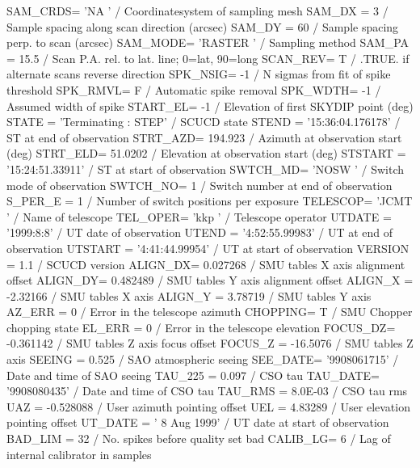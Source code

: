 \documentclass[twoside,11pt,nolof]{starlink}
\begin{document}
\begin{small}
\begin{terminalv}
SAM_CRDS= 'NA      '           / Coordinatesystem of sampling mesh
SAM_DX  =                    3 / Sample spacing along scan direction (arcsec)
SAM_DY  =                   60 / Sample spacing perp. to scan (arcsec)
SAM_MODE= 'RASTER  '           / Sampling method
SAM_PA  =                 15.5 / Scan P.A. rel. to lat. line; 0=lat, 90=long
SCAN_REV=                    T / .TRUE. if alternate scans reverse direction
SPK_NSIG=                   -1 / N sigmas from fit of spike threshold
SPK_RMVL=                    F / Automatic spike removal
SPK_WDTH=                   -1 / Assumed width of spike
START_EL=                   -1 / Elevation of first SKYDIP point (deg)
STATE   = 'Terminating         :   STEP' / SCUCD state
STEND   = '15:36:04.176178'    / ST at end of observation
STRT_AZD=              194.923 / Azimuth at observation start (deg)
STRT_ELD=              51.0202 / Elevation at observation start (deg)
STSTART = '15:24:51.33911'     / ST at start of observation
SWTCH_MD= 'NOSW    '           / Switch mode of observation
SWTCH_NO=                    1 / Switch number at end of observation
S_PER_E =                    1 / Number of switch positions per exposure
TELESCOP= 'JCMT    '           / Name of telescope
TEL_OPER= 'kkp     '           / Telescope operator
UTDATE  = '1999:8:8'           / UT date of observation
UTEND   = '4:52:55.99983'      / UT at end of observation
UTSTART = '4:41:44.99954'      / UT at start of observation
VERSION =                  1.1 / SCUCD version
ALIGN_DX=             0.027268 / SMU tables X axis alignment offset
ALIGN_DY=             0.482489 / SMU tables Y axis alignment offset
ALIGN_X =             -2.32166 / SMU tables X axis
ALIGN_Y =              3.78719 / SMU tables Y axis
AZ_ERR  =                    0 / Error in the telescope azimuth
CHOPPING=                    T / SMU Chopper chopping state
EL_ERR  =                    0 / Error in the telescope elevation
FOCUS_DZ=            -0.361142 / SMU tables Z axis focus offset
FOCUS_Z =             -16.5076 / SMU tables Z axis
SEEING  =                0.525 / SAO atmospheric seeing
SEE_DATE= '9908061715'         / Date and time of SAO seeing
TAU_225 =                0.097 / CSO tau
TAU_DATE= '9908080435'         / Date and time of CSO tau
TAU_RMS =              8.0E-03 / CSO tau rms
UAZ     =            -0.528088 / User azimuth pointing offset
UEL     =              4.83289 / User elevation pointing offset
UT_DATE = ' 8 Aug 1999'        / UT date at start of observation
BAD_LIM =                   32 / No. spikes before quality set bad
CALIB_LG=                    6 / Lag of internal calibrator in samples

\end{terminalv}
\end{small}
\end{document}

